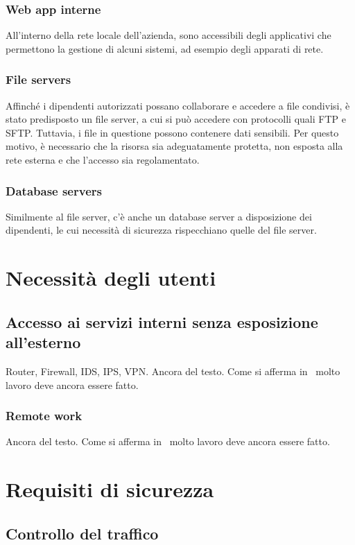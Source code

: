 \subsubsection{Web app interne}
All'interno della rete locale dell'azienda, sono accessibili degli applicativi che permettono la gestione di alcuni sistemi, ad esempio degli apparati di rete.
\subsubsection{File servers}
Affinché i dipendenti autorizzati possano collaborare e accedere a file condivisi, è stato predisposto un file server, a cui si può accedere con protocolli quali FTP \cite[RFC0791]{RFC0959} e SFTP. Tuttavia, i file in questione possono contenere dati sensibili. Per questo motivo, è necessario che la risorsa sia adeguatamente protetta, non esposta alla rete esterna e che l'accesso sia regolamentato.

\subsubsection{Database servers}
Similmente al file server, c'è anche un database server a disposizione dei dipendenti, le cui necessità di sicurezza rispecchiano quelle del file server.

\section{Necessità degli utenti}
\subsection{Accesso ai servizi interni senza esposizione all'esterno}
Router, Firewall, IDS, IPS, VPN. Ancora del testo. Come si afferma in~\cite{jones96analysis} molto lavoro deve ancora essere fatto.
\subsubsection{Remote work}
Ancora del testo. Come si afferma in~\cite{jones96analysis} molto lavoro deve ancora essere fatto.

\section{Requisiti di sicurezza}
\subsection{Controllo del traffico}
